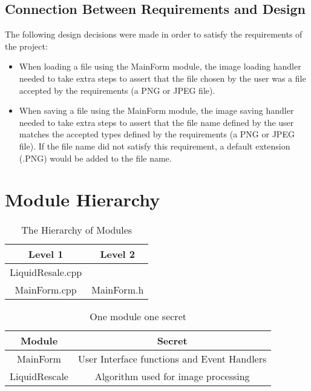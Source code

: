 \documentclass{article}
\begin{document}
\subsection{Connection Between Requirements and Design}
The following design decisions were made in order to satisfy the requirements of the project:
\begin{itemize}
\item When loading a file using the MainForm module, the image loading handler needed to take extra steps to assert that the file chosen by the user was a file accepted by the requirements (a PNG or JPEG file). 
\item When saving a file using the MainForm module, the image saving handler needed to take extra steps to assert that the file name defined by the user matches the accepted types defined by the requirements (a PNG or JPEG file). If the file name did not satisfy this requirement, a default extension (.PNG) would be added to the file name.
\end{itemize}




\section{Module Hierarchy}
\begin{table}[h!]
    \centering
    \caption{The Hierarchy of Modules}
    \begin{tabular}{| c | c |}
        \hline Level 1 & Level 2 \\
        \hline LiquidResale.cpp &   \\  
        \hline MainForm.cpp & MainForm.h \\
        \hline
    \end{tabular}
\end{table}


\begin{table}[h!]
    \centering
    \caption{One module one secret}
    \begin{tabular}{| c | c |}
        \hline Module & Secret \\
        \hline MainForm & User Interface functions and Event Handlers \\  
        \hline LiquidRescale & Algorithm used for image processing \\
        \hline
    \end{tabular}
\end{table}

\newpage
\end{document}
